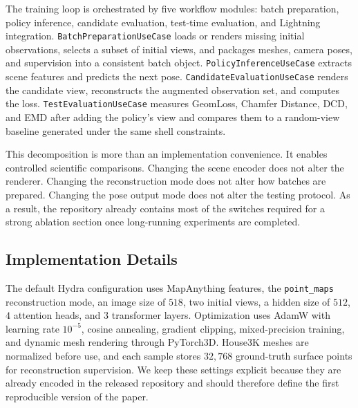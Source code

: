 The training loop is orchestrated by five workflow modules: batch preparation, policy inference, candidate evaluation, test-time evaluation, and Lightning integration. \texttt{BatchPreparationUseCase} loads or renders missing initial observations, selects a subset of initial views, and packages meshes, camera poses, and supervision into a consistent batch object. \texttt{PolicyInferenceUseCase} extracts scene features and predicts the next pose. \texttt{CandidateEvaluationUseCase} renders the candidate view, reconstructs the augmented observation set, and computes the loss. \texttt{TestEvaluationUseCase} measures GeomLoss, Chamfer Distance, DCD, and EMD after adding the policy's view and compares them to a random-view baseline generated under the same shell constraints.

This decomposition is more than an implementation convenience. It enables controlled scientific comparisons. Changing the scene encoder does not alter the renderer. Changing the reconstruction mode does not alter how batches are prepared. Changing the pose output mode does not alter the testing protocol. As a result, the repository already contains most of the switches required for a strong ablation section once long-running experiments are completed.

\subsection{Implementation Details}
\label{sec:impl}

The default Hydra configuration uses MapAnything features, the \texttt{point\_maps} reconstruction mode, an image size of $518$, two initial views, a hidden size of $512$, $4$ attention heads, and $3$ transformer layers. Optimization uses AdamW with learning rate $10^{-5}$, cosine annealing, gradient clipping, mixed-precision training, and dynamic mesh rendering through PyTorch3D. House3K meshes are normalized before use, and each sample stores $32{,}768$ ground-truth surface points for reconstruction supervision. We keep these settings explicit because they are already encoded in the released repository and should therefore define the first reproducible version of the paper.
